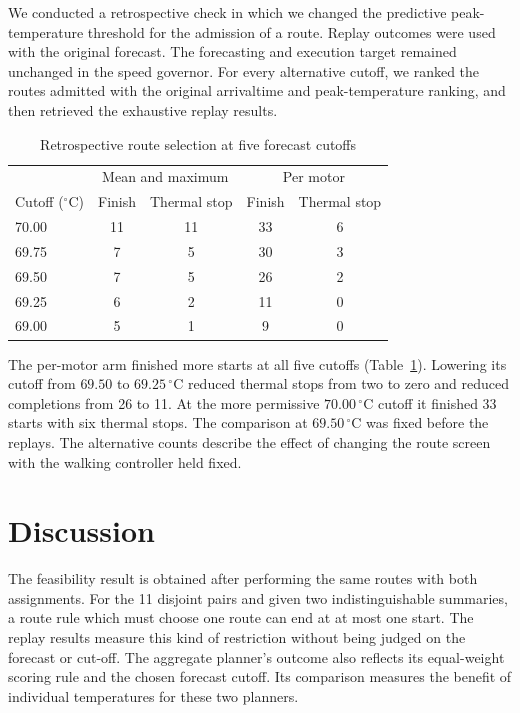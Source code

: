 \documentclass{ieeeaccess}
\begin{document}
We conducted a retrospective check in which we changed the predictive peak-temperature threshold for the admission of a route. Replay outcomes were used with the original forecast. The forecasting and execution target remained unchanged in the speed governor. For every alternative cutoff, we ranked the routes admitted with the original arrivaltime and peak-temperature ranking, and then retrieved the exhaustive replay results.

\begin{table}[!t]
\caption{Retrospective route selection at five forecast cutoffs}
\label{tab:sensitivity}
\centering
\footnotesize
\setlength{\tabcolsep}{3pt}
\renewcommand{\arraystretch}{1.14}
\begin{tabular}{@{}lcccc@{}}
\hline
& \multicolumn{2}{c}{Mean and maximum} & \multicolumn{2}{c}{Per motor} \\
\shortstack{Cutoff\\(\ensuremath{{}^\circ\mathrm{C}})} & Finish & Thermal stop & Finish & Thermal stop \\
\hline
70.00 & 11 & 11 & 33 & 6 \\
69.75 & 7 & 5 & 30 & 3 \\
69.50 & 7 & 5 & 26 & 2 \\
69.25 & 6 & 2 & 11 & 0 \\
69.00 & 5 & 1 & 9 & 0 \\
\hline
\end{tabular}
\end{table}

The per-motor arm finished more starts at all five cutoffs (Table~\ref{tab:sensitivity}). Lowering its cutoff from $69.50$ to $69.25\,{}^\circ\mathrm{C}$ reduced thermal stops from two to zero and reduced completions from 26 to 11. At the more permissive $70.00\,{}^\circ\mathrm{C}$ cutoff it finished 33 starts with six thermal stops. The comparison at $69.50\,{}^\circ\mathrm{C}$ was fixed before the replays. The alternative counts describe the effect of changing the route screen with the walking controller held fixed.

\section{Discussion}

The feasibility result is obtained after performing the same routes with both assignments. For the 11 disjoint pairs and given two indistinguishable summaries, a route rule which must choose one route can end at at most one start. The replay results measure this kind of restriction without being judged on the forecast or cut-off. The aggregate planner's outcome also reflects its equal-weight scoring rule and the chosen forecast cutoff. Its comparison measures the benefit of individual temperatures for these two planners.
\end{document}
